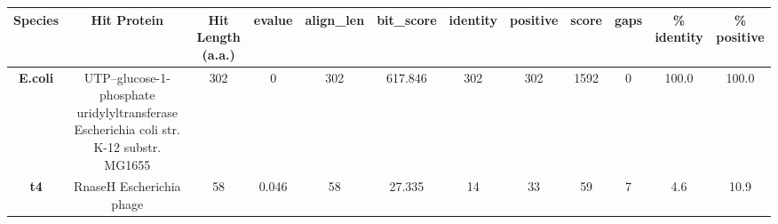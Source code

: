 \begin{tabular}{|c|c|c|c|c|c|c|c|c|c|c|c|} \hline
\textbf{Species} & \textbf{Hit Protein} & \textbf{Hit Length (a.a.)} & \textbf{evalue} & \textbf{align\_len} & \textbf{bit\_score} & \textbf{identity} & \textbf{positive} & \textbf{score} & \textbf{gaps} & \textbf{\% identity} & \textbf{\% positive} \\ \hline
\textbf{E.coli} & UTP--glucose-1-phosphate uridylyltransferase Escherichia coli str. K-12 substr. MG1655 & 302 & 0 & 302 & 617.846 & 302 & 302 & 1592 & 0 & 100.0 & 100.0\\
\textbf{t4} & RnaseH Escherichia phage  & 58 & 0.046 & 58 & 27.335 & 14 & 33 & 59 & 7 & 4.6 & 10.9\\
\hline \end{tabular}
